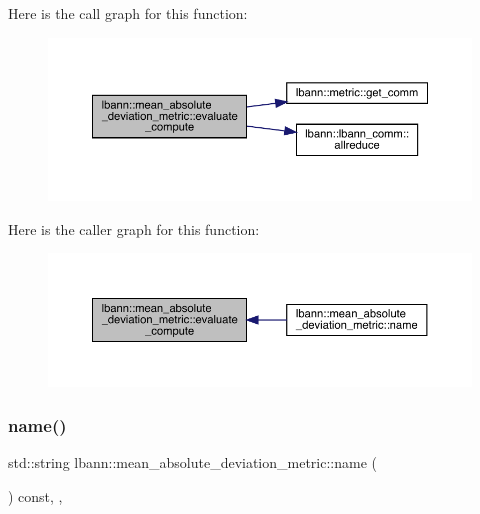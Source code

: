 Here is the call graph for this function\+:\nopagebreak
\begin{figure}[H]
\begin{center}
\leavevmode
\includegraphics[width=350pt]{classlbann_1_1mean__absolute__deviation__metric_a4096a6f389b2f18ff6c19428313f2969_cgraph}
\end{center}
\end{figure}
Here is the caller graph for this function\+:\nopagebreak
\begin{figure}[H]
\begin{center}
\leavevmode
\includegraphics[width=350pt]{classlbann_1_1mean__absolute__deviation__metric_a4096a6f389b2f18ff6c19428313f2969_icgraph}
\end{center}
\end{figure}
\mbox{\label{classlbann_1_1mean__absolute__deviation__metric_a6b2f0542a991b632414dc217586db905}} 
\subsubsection{\texorpdfstring{name()}{name()}}
{\footnotesize\ttfamily std\+::string lbann\+::mean\+\_\+absolute\+\_\+deviation\+\_\+metric\+::name (\begin{DoxyParamCaption}{ }\end{DoxyParamCaption}) const\hspace{0.3cm}{\ttfamily [inline]}, {\ttfamily [override]}, {\ttfamily [virtual]}}

